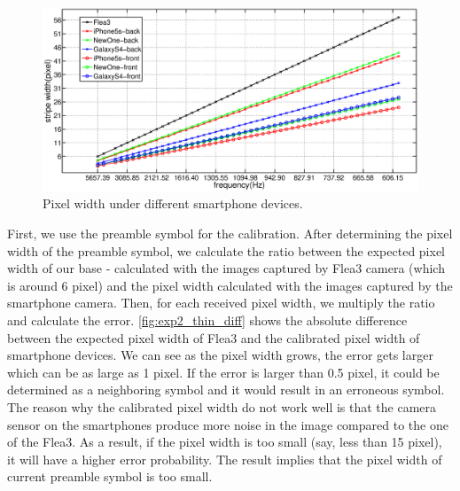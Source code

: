 \begin{figure}[!htb]
  \hspace{-5em}
  \includegraphics[scale=0.2]{fig/exp2_tr_new.eps}
  \caption{Pixel width under different smartphone devices.}
  \label{fig:exp2_tr}
\end{figure}

First, we use the preamble symbol for the calibration. After determining the pixel width of the preamble symbol, we calculate the ratio between the expected pixel width of our base - calculated with the images captured by Flea3 camera (which is around 6 pixel) and the pixel width calculated with the images captured by the smartphone camera. Then, for each received pixel width, we multiply the ratio and calculate the error. \autoref{fig:exp2_thin_diff} shows the absolute difference between the expected pixel width of Flea3 and the calibrated pixel width of smartphone devices. We can see as the pixel width grows, the error gets larger which can be as large as 1 pixel. If the error is larger than 0.5 pixel, it could be determined as a neighboring symbol and it would result in an erroneous symbol. The reason why the calibrated pixel width do not work well is that the camera sensor on the smartphones produce more noise in the image compared to the one of the Flea3. As a result, if the pixel width is too small (say, less than 15 pixel), it will have a higher error probability. The result implies that the pixel width of current preamble symbol is too small.

